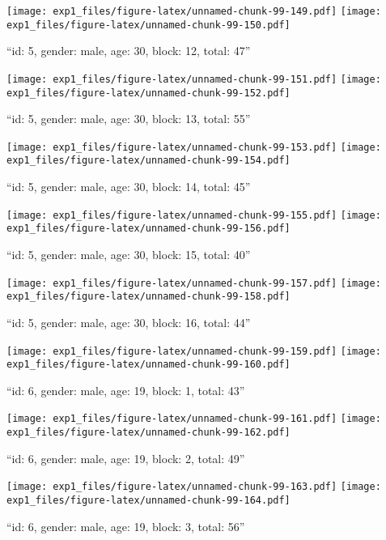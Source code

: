 \documentclass[,]{article}
\begin{document}
\texttt{[image: exp1\_files/figure-latex/unnamed-chunk-99-149.pdf]}
\texttt{[image: exp1\_files/figure-latex/unnamed-chunk-99-150.pdf]}

\newpage
[1] 

``id: 5, gender: male, age: 30, block: 12, total: 47''

\texttt{[image: exp1\_files/figure-latex/unnamed-chunk-99-151.pdf]}
\texttt{[image: exp1\_files/figure-latex/unnamed-chunk-99-152.pdf]}

\newpage
[1] 

``id: 5, gender: male, age: 30, block: 13, total: 55''

\texttt{[image: exp1\_files/figure-latex/unnamed-chunk-99-153.pdf]}
\texttt{[image: exp1\_files/figure-latex/unnamed-chunk-99-154.pdf]}

\newpage
[1] 

``id: 5, gender: male, age: 30, block: 14, total: 45''

\texttt{[image: exp1\_files/figure-latex/unnamed-chunk-99-155.pdf]}
\texttt{[image: exp1\_files/figure-latex/unnamed-chunk-99-156.pdf]}

\newpage
[1] 

``id: 5, gender: male, age: 30, block: 15, total: 40''

\texttt{[image: exp1\_files/figure-latex/unnamed-chunk-99-157.pdf]}
\texttt{[image: exp1\_files/figure-latex/unnamed-chunk-99-158.pdf]}

\newpage
[1] 

``id: 5, gender: male, age: 30, block: 16, total: 44''

\texttt{[image: exp1\_files/figure-latex/unnamed-chunk-99-159.pdf]}
\texttt{[image: exp1\_files/figure-latex/unnamed-chunk-99-160.pdf]}

\newpage
[1] 

``id: 6, gender: male, age: 19, block: 1, total: 43''

\texttt{[image: exp1\_files/figure-latex/unnamed-chunk-99-161.pdf]}
\texttt{[image: exp1\_files/figure-latex/unnamed-chunk-99-162.pdf]}

\newpage
[1] 

``id: 6, gender: male, age: 19, block: 2, total: 49''

\texttt{[image: exp1\_files/figure-latex/unnamed-chunk-99-163.pdf]}
\texttt{[image: exp1\_files/figure-latex/unnamed-chunk-99-164.pdf]}

\newpage
[1] 

``id: 6, gender: male, age: 19, block: 3, total: 56''
\end{document}
